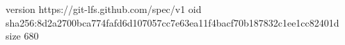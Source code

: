 version https://git-lfs.github.com/spec/v1
oid sha256:8d2a2700bca774fafd6d107057cc7e63ea11f4bacf70b187832c1ee1cc82401d
size 680
